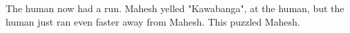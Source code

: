 The human now had a run. Mahesh yelled "Kawabanga", at the human, but the human just ran even faster away from Mahesh. This puzzled Mahesh.
